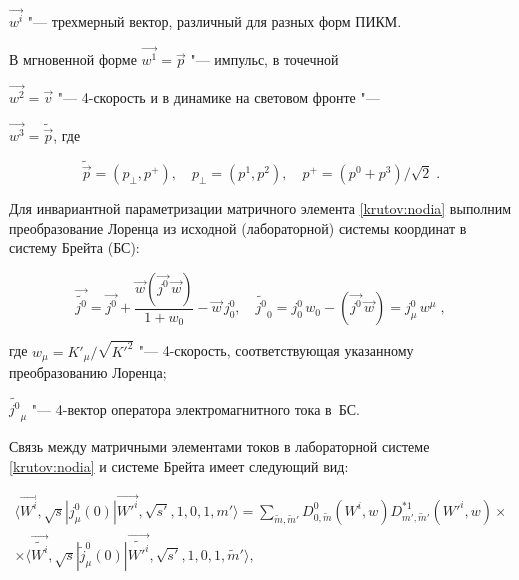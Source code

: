 $\vec{w^{i}}$ "--- трехмерный вектор, различный для разных форм ПИКМ.

В мгновенной форме $\vec{w^{1}}=\vec{p}$ "--- импульс, в точечной 

$\vec{w^{2}}=\vec{v}$ "--- 4-скорость и в динамике на световом фронте "---

$\vec{w^{3}}=\tilde{\vec{p}}$, где

 \begin{equation}


\tilde{\vec{{p}}}=(p_{\bot},p^{+}), \quad p_{\bot}=(p^{1},p^{2}),

\quad p^{+}=(p^{0}+p^{3})/\sqrt{2}\;.

\end{equation}





Для инвариантной параметризации матричного элемента \eqref{krutov:nodia} выполним преобразование Лоренца из исходной (лабораторной) системы координат в систему Брейта (БС):

\begin{equation}

\label{krutov:lor}

 \vec{\tilde{j^0}} = \vec{j^0}+\frac{\vec{w}(\vec{j^0}\,\vec{w})}{1+w_{0}}-\vec{w}\,j^0_{0}, \quad

 \tilde{j^0}_{0} = j^0_{0}\,w_{0}-(\vec{j^0}\,\vec{w}) = j^0_{\mu}\,w^{\mu}\;,

\end{equation}

где $w_{\mu}={K'_{\mu}}/{\sqrt{K'^{2}}}$ "--- 4-скорость, соответствующая указанному преобразованию Лоренца;

$\tilde{j^0}_{\mu}$ "--- 4-вектор оператора электромагнитного тока в~БС.





Связь между матричными элементами токов в лабораторной системе \eqref{krutov:nodia} и системе Брейта  имеет следующий вид:

\begin{multline}

\label{krutov:diagonal111}

\langle\vec{W^{i}},\sqrt{s}|j_{\mu}^{0}(0)|\vec{W'^{i}},\sqrt{s'}, 1, 0, 1, m'\rangle =

\sum_{\tilde{m},\tilde{m}'}D^{0}_{0,\tilde{m}}(W^{i},w)D^{*{1}}_{m',\tilde{m}'}(W'^{i},w) \times\\

\times\langle\vec{\tilde{W^{i}}},\sqrt{s}|\tilde{j}_{\mu}^{0}(0)|\vec{\tilde{W'^{i}}},\sqrt{s'}, 1, 0, 1,\tilde{m}'\rangle,

\end{multline}

